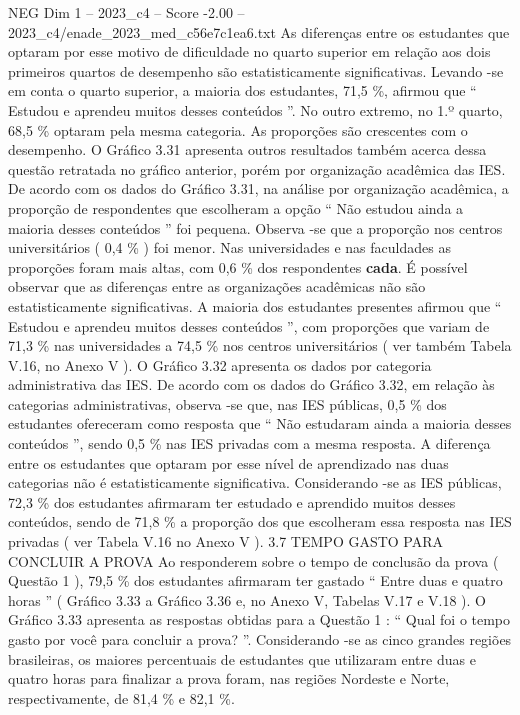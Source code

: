 \begin{textsample}{NEG Dim 1 – 2023\_c4 – Score -2.00 – 2023\_c4/enade\_2023\_med\_c56e7c1ea6.txt}
As diferenças entre os estudantes que optaram por esse motivo de dificuldade no quarto superior em relação aos dois primeiros quartos de desempenho são estatisticamente significativas.
Levando -se em conta o quarto superior, a maioria dos estudantes, 71,5 \%, afirmou que “ Estudou e aprendeu muitos desses conteúdos ”.
No outro extremo, no 1.º quarto, 68,5 \% optaram pela mesma categoria.
As proporções são crescentes com o desempenho.
O Gráfico 3.31 apresenta outros resultados também acerca dessa questão retratada no gráfico anterior, porém por organização acadêmica das IES.
De acordo com os dados do Gráfico 3.31, na análise por organização acadêmica, a proporção de respondentes que escolheram a opção “ Não estudou ainda a maioria desses conteúdos ” foi pequena.
Observa -se que a proporção nos centros universitários ( 0,4 \% ) foi menor.
Nas universidades e nas faculdades as proporções foram mais altas, com 0,6 \% dos respondentes \textbf{cada}.
É possível observar que as diferenças entre as organizações acadêmicas não são estatisticamente significativas.
A maioria dos estudantes presentes afirmou que “ Estudou e aprendeu muitos desses conteúdos ”, com proporções que variam de 71,3 \% nas universidades a 74,5 \% nos centros universitários ( ver também Tabela V.16, no Anexo V ).
O Gráfico 3.32 apresenta os dados por categoria administrativa das IES.
De acordo com os dados do Gráfico 3.32, em relação às categorias administrativas, observa -se que, nas IES públicas, 0,5 \% dos estudantes ofereceram como resposta que “ Não estudaram ainda a maioria desses conteúdos ”, sendo 0,5 \% nas IES privadas com a mesma resposta.
A diferença entre os estudantes que optaram por esse nível de aprendizado nas duas categorias não é estatisticamente significativa.
Considerando -se as IES públicas, 72,3 \% dos estudantes afirmaram ter estudado e aprendido muitos desses conteúdos, sendo de 71,8 \% a proporção dos que escolheram essa resposta nas IES privadas ( ver Tabela V.16 no Anexo V ). 3.7 TEMPO GASTO PARA CONCLUIR A PROVA Ao responderem sobre o tempo de conclusão da prova ( Questão 1 ), 79,5 \% dos estudantes afirmaram ter gastado “ Entre duas e quatro horas ” ( Gráfico 3.33 a Gráfico 3.36 e, no Anexo V, Tabelas V.17 e V.18 ).
O Gráfico 3.33 apresenta as respostas obtidas para a Questão 1 : “ Qual foi o tempo gasto por você para concluir a prova? ”.
Considerando -se as cinco grandes regiões brasileiras, os maiores percentuais de estudantes que utilizaram entre duas e quatro horas para finalizar a prova foram, nas regiões Nordeste e Norte, respectivamente, de 81,4 \% e 82,1 \%.

\end{textsample}
